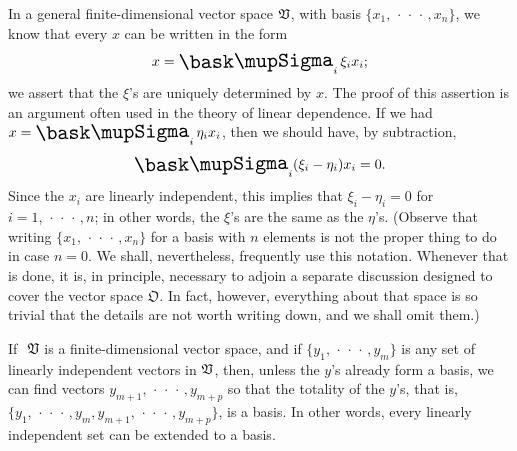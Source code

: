 In a general finite-dimensional vector space \(  \mathfrak{V}\), with basis
\(\{x_1,\,\cdot\,\cdot\,\cdot\,,x_n\}\), we know that every \(x\) can be written in the form
\begin{equation*}
    \textstyle x = \sumx_i \xi_i x_i;
\end{equation*}
we assert that the \(\xi\)'s are uniquely determined by \(x\). The proof of this
assertion is an argument often used in the theory of linear dependence. If we
had \(x = \sumx_i \eta_i x_i\), then we should have, by subtraction,
\begin{equation*}
    \textstyle \sumx_i (\xi_i - \eta_i) x_i = 0.
\end{equation*}
Since the \(x_i\) are linearly independent, this implies that \(\xi_i - \eta_i =
0\) for \(i = 1, \,\cdot\,\cdot\,\cdot\, , n\); in other words, the \(\xi\)'s
are the same as the \(\eta\)'s. (Observe that writing
\(\{x_1,\,\cdot\,\cdot\,\cdot\,,x_n\}\) for a basis with \(n\) elements is not
the proper thing to do in case \(n = 0\). We shall, nevertheless, frequently use
this notation. Whenever that is done, it is, in principle, necessary to adjoin a
separate discussion designed to cover the vector space \(\mathfrak{O}\). In
fact, however, everything about that space is so trivial that the details are
not worth writing down, and we shall omit them.)

\begin{thmx}
    If \(~\mathfrak{V}\) is a finite-dimensional vector space, and if \(\{y_1,
    \,\cdot\,\cdot\,\cdot\,, y_m\}\) is any set of linearly independent vectors
    in \(\mathfrak{V}\), then, unless the \(y\)'s already form a basis, we can find
    vectors \(y_{m+1}, \,\cdot\,\cdot\,\cdot\,, y_{m+p}\) so that the totality
    of the \(y\)'s, that is, \(\{y_1, \,\cdot\,\cdot\,\cdot\,, y_m, y_{m+1},
    \,\cdot\,\cdot\,\cdot\,, y_{m+p}\}\), is a basis. In other words, every
    linearly independent set can be extended to a basis.
\end{thmx}

